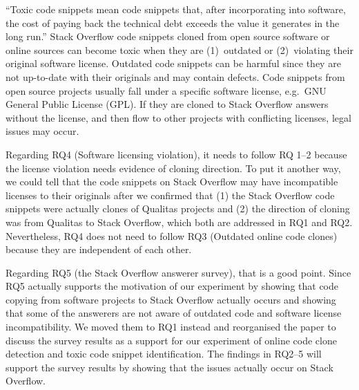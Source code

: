 \documentclass[a4paper,twoside,10pt]{reviewresponse}
\begin{document}
``Toxic code snippets mean code snippets that, after incorporating into software,
the cost of paying back the technical debt exceeds the value it generates in the long run.'' 
Stack Overflow code snippets
cloned from open source software or online sources can become toxic when they
are (1)~outdated or (2)~violating their original software
license. Outdated code snippets
can be harmful since they are not up-to-date with their originals and may
contain defects. Code snippets from open source projects usually fall under a
specific software license, e.g.\ GNU General Public License (GPL). If they are
cloned to Stack Overflow answers without the license, and then flow to other projects
with conflicting licenses, legal issues may occur.
 

Regarding RQ4 (Software licensing violation), it needs to follow RQ 1--2 because the license violation needs evidence of cloning direction. To put it another way, we could tell that the code snippets on Stack Overflow may have incompatible licenses to their originals after we confirmed that (1) the Stack Overflow code snippets were actually clones of Qualitas projects and (2) the direction of cloning was from Qualitas to Stack Overflow, which both are addressed in RQ1 and RQ2.
Nevertheless, RQ4 does not need to follow RQ3 (Outdated online code clones) because they are independent of each other.

Regarding RQ5 (the Stack Overflow answerer survey), that is a good point. Since RQ5 actually supports the motivation of our experiment by showing that code copying from software projects to Stack Overflow actually occurs and showing that some of the answerers are not aware of outdated code and software license incompatibility. We moved them to RQ1 instead and reorganised the paper to discuss the survey results as a support for our experiment of online code clone detection and toxic code snippet identification. The findings in RQ2--5 will support the survey results by showing that the issues actually occur on Stack Overflow.
\end{document}
